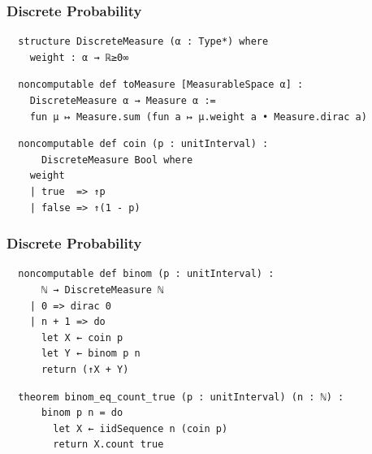 \documentclass[11pt,aspectratio=169]{beamer}
\begin{document}
%
%
%
%
%
%
%
%
%

\begin{frame}[fragile]
  \frametitle{Discrete Probability}
  \begin{verbatim}
  structure DiscreteMeasure (α : Type*) where
    weight : α → ℝ≥0∞
  \end{verbatim}

  \vfill

  \begin{verbatim}
  noncomputable def toMeasure [MeasurableSpace α] :
    DiscreteMeasure α → Measure α :=
    fun μ ↦ Measure.sum (fun a ↦ μ.weight a • Measure.dirac a)
  \end{verbatim}

  \vfill

  \begin{verbatim}
  noncomputable def coin (p : unitInterval) :
      DiscreteMeasure Bool where
    weight
    | true  => ↑p
    | false => ↑(1 - p)
  \end{verbatim}
\end{frame}

\begin{frame}[fragile]
  \frametitle{Discrete Probability}
  \begin{verbatim}
  noncomputable def binom (p : unitInterval) :
      ℕ → DiscreteMeasure ℕ
    | 0 => dirac 0
    | n + 1 => do
      let X ← coin p
      let Y ← binom p n
      return (↑X + Y)
  \end{verbatim}
  \begin{verbatim}
  theorem binom_eq_count_true (p : unitInterval) (n : ℕ) :
      binom p n = do
        let X ← iidSequence n (coin p)
        return X.count true
  \end{verbatim}
\end{frame}
\end{document}

